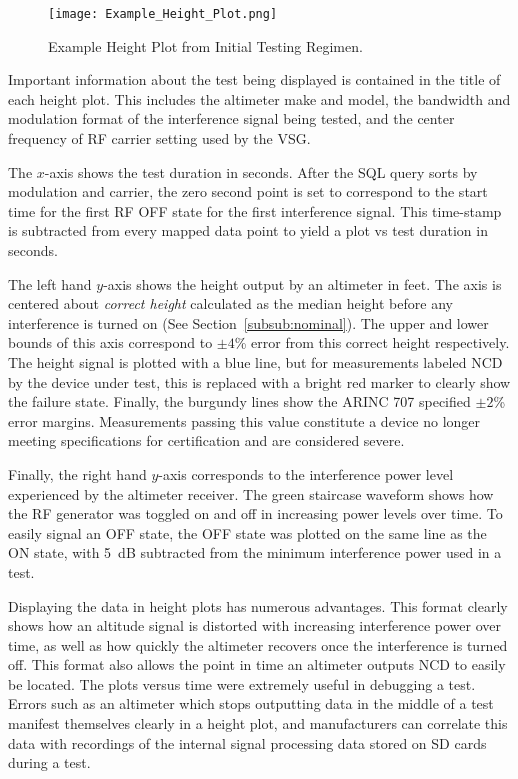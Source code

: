 \begin{figure}[h!]
	\centering
	\texttt{[image: Example\_Height\_Plot.png]}
	\caption{Example Height Plot from Initial Testing Regimen.}
	\label{fig:height_plot_example}
\end{figure}
Important information about the test being displayed is contained in the title of each height plot. This includes the altimeter make and model, the bandwidth and modulation format of the interference signal being tested, and the center frequency of RF carrier setting used by the VSG.

The $x$-axis shows the test duration in seconds. After the SQL query sorts by modulation and carrier, the zero second point is set to correspond to the start time for the first RF OFF state for the first interference signal. This time-stamp is subtracted from every mapped data point to yield a plot vs test duration in seconds.

The left hand $y$-axis shows the height output by an altimeter in feet. The axis is centered about \textit{correct height} calculated as the median height before any interference is turned on (See Section~\ref{subsub:nominal}). The upper and lower bounds of this axis correspond to $\pm4$\% error from this correct height respectively. The height signal is plotted with a blue line, but for measurements labeled NCD by the device under test, this is replaced with a bright red marker to clearly show the failure state. Finally, the burgundy lines show the ARINC 707 specified $\pm2$\% error margins. Measurements passing this value constitute a device no longer meeting specifications for certification and are considered severe.  

Finally, the right hand $y$-axis corresponds to the interference power level experienced by the altimeter receiver. The green staircase waveform shows how the RF generator was toggled on and off in increasing power levels over time. To easily signal an OFF state, the OFF state was plotted on the same line as the ON state, with 5~dB subtracted from the minimum interference power used in a test. 

Displaying the data in height plots has numerous advantages. This format clearly shows how an altitude signal is distorted with increasing interference power over time, as well as how quickly the altimeter recovers once the interference is turned off. This format also allows the point in time an altimeter outputs NCD to easily be located. The plots versus time were extremely useful in debugging a test. Errors such as an altimeter which stops outputting data in the middle of a test manifest themselves clearly in a height plot, and manufacturers can correlate this data with recordings of the internal signal processing data stored on SD cards during a test.  


